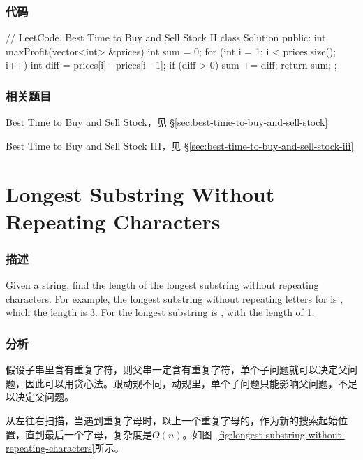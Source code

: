\subsubsection{代码}
\begin{Code}
// LeetCode, Best Time to Buy and Sell Stock II
class Solution {
public:
    int maxProfit(vector<int> &prices) {
        int sum = 0;
        for (int i = 1; i < prices.size(); i++) {
            int diff = prices[i] - prices[i - 1];
            if (diff > 0) sum += diff;
        }
        return sum;
    }
};
\end{Code}


\subsubsection{相关题目}
\begindot
\item Best Time to Buy and Sell Stock，见 \S \ref{sec:best-time-to-buy-and-sell-stock}
\item Best Time to Buy and Sell Stock III，见 \S \ref{sec:best-time-to-buy-and-sell-stock-iii}
\myenddot


\section{Longest Substring Without Repeating Characters} %
\label{sec:longest-substring-without-repeating-characters}


\subsubsection{描述}
Given a string, find the length of the longest substring without repeating characters. For example, the longest substring without repeating letters for  is , which the length is 3. For  the longest substring is , with the length of 1.


\subsubsection{分析}
假设子串里含有重复字符，则父串一定含有重复字符，单个子问题就可以决定父问题，因此可以用贪心法。跟动规不同，动规里，单个子问题只能影响父问题，不足以决定父问题。

从左往右扫描，当遇到重复字母时，以上一个重复字母的，作为新的搜索起始位置，直到最后一个字母，复杂度是$O(n)$。如图~\ref{fig:longest-substring-without-repeating-characters}所示。

